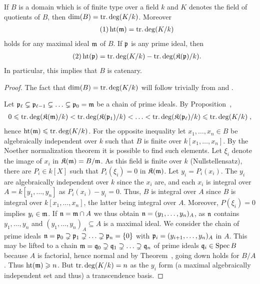 \documentclass[a4paper,parskip=half,numbers=enddot, DIV=12]{scrreprt}
\renewcommand{\geq}{\geqslant}
\renewcommand{\leq}{\leqslant}
\begin{document}
	\begin{thm}
		If $B$ is a domain which is of finite type over a field $k$ and $K$ denotes the field of quotients of $B$, then $\dim (B) = \operatorname{tr.deg}(K/k)$. Moreover 
		\begin{align*}\tag{1} \lbl{eq:thm10eq1}
			\hoehe(\mm) = \trdeg(K/k)
		\end{align*}
		holds for any maximal ideal $\mathfrak{m}$ of $B$. If $\mathfrak{p}$ is any prime ideal, then 
		\begin{align*}\tag{2} \lbl{eq:thm10eq2}
			\hoehe(\pp) = \trdeg(K/k) -\trdeg(\KK(\pp)/k).
		\end{align*}
		In particular, this implies that $B$ is catenary.
	\end{thm}
	\begin{proof}
		The fact that $\dim (B)=\operatorname{tr.deg}(K/k)$ will follow trivially from  and . 
		
		Let $\mathfrak{p}_\ell\subsetneq\mathfrak{p}_{\ell-1}\subsetneq\ldots\subsetneq\mathfrak{p}_0=\mathfrak{m}$ be a chain of prime ideals. By Proposition~,
		\begin{align*}
			0\leq\trdeg(\KK(\mm)/k)<\trdeg(\KK(\pp_1)/k)<\ldots<\trdeg(\KK(\pp_\ell)/k)\leq\trdeg(K/k)\;,
		\end{align*}
		hence $\hoehe(\mm) \leq \trdeg(K/k)$. 	For the opposite inequality let $x_1,\ldots,x_n\in B$ be algebraically independent over $k$ such that $B$ is finite over $k[x_1,\ldots,x_n]$. By the Noether normalization theorem it is possible to find such elements. Let $\xi_i$ denote the image of $x_i$ in $\mathfrak{K}(\mathfrak{m}) = B/\mathfrak{m}$. As this field is finite over $k$ (Nullstellensatz), there are $P_i\in k[X]$ such that $P_i(\xi_i) = 0$ in $\mathfrak{K}(\mathfrak{m})$. Let $y_i=P_i(x_i)$. The $y_i$ are algebraically independent over $k$ since the $x_i$ are, and each $x_i$ is integral over $A=k[y_1,\ldots,y_n]$ as $P_i(x_i)-y_i=0$.  Thus, $B$ is integral over $A$ since $B$ is integral over $k[x_1,\ldots,x_n]$, the latter being integral over $A$. Moreover, $P(\xi_i)=0$ implies $y_i\in\mathfrak{m}$. If $\mathfrak{n} = \mathfrak{m}\cap A$ we thus obtain $\mathfrak{n}=(y_1,\ldots,y_n)_A$, as $\mathfrak{n}$ contains $y_1,\ldots,y_n$ and $(y_1,\ldots,y_n)_A\subseteq A$ is a maximal ideal. We consider the chain of prime ideals $\mathfrak{n} = \mathfrak{p}_0\supsetneq \mathfrak{p}_1\supsetneq\ldots\supsetneq \mathfrak{p}_n = \{0\}$ with $\mathfrak{p}_i = ( y_{i+1},\ldots,y_n)_A$ in $A$. This may be lifted to a chain $\mathfrak{m}=\mathfrak{q}_0\supsetneq \mathfrak{q}_1\supsetneq\ldots\supsetneq \mathfrak{q}_n$ of prime ideals $\mathfrak{q}_i\in\operatorname{Spec} B$ because $A$ is factorial, hence normal and by Theorem~, going down holds for $B/A$. Thus $\hoehe(\mm) \geq n$. But $\operatorname{tr.deg}(K/k) = n$ as the $y_i$ form (a maximal algebraically independent set and thus) a transcendence basis.
		

\end{proof}
\end{document}
